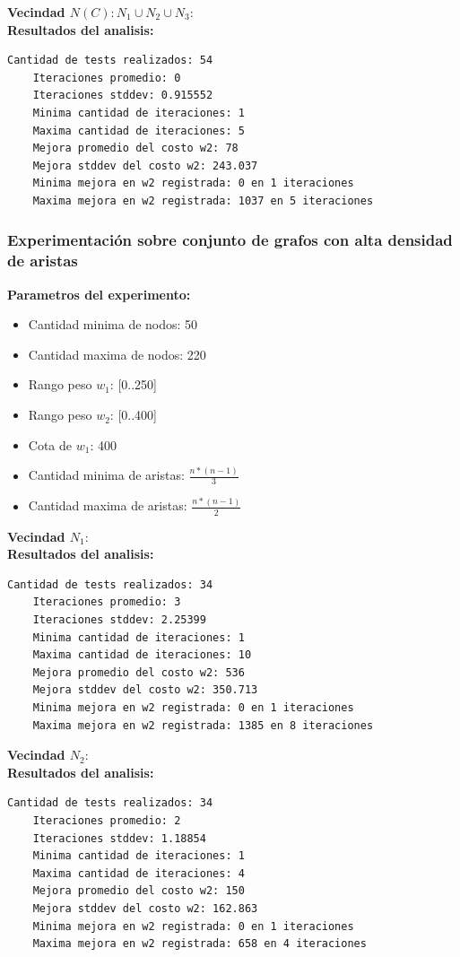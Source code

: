 \textbf{Vecindad $N(C): N_1 \cup N_2 \cup N_3$}:\\
\textbf{Resultados del analisis:}
\begin{lstlisting}[frame=single]
	Cantidad de tests realizados: 54
	Iteraciones promedio: 0
	Iteraciones stddev: 0.915552
	Minima cantidad de iteraciones: 1
	Maxima cantidad de iteraciones: 5
	Mejora promedio del costo w2: 78
	Mejora stddev del costo w2: 243.037
	Minima mejora en w2 registrada: 0 en 1 iteraciones
	Maxima mejora en w2 registrada: 1037 en 5 iteraciones
\end{lstlisting}

\subsubsection{Experimentaci\'on sobre conjunto de grafos con alta densidad de aristas}

\textbf{Parametros del experimento:}
\begin{itemize}
	\item Cantidad minima de nodos: 50
	\item Cantidad maxima de nodos: 220
	\item Rango peso $w_1$: [0..250]
	\item Rango peso $w_2$: [0..400]
	\item Cota de $w_1$: 400
	\item Cantidad minima de aristas: $\frac{n * (n-1)}{3}$
	\item Cantidad maxima de aristas: $\frac{n * (n-1)}{2}$
\end{itemize}  

\textbf{Vecindad $N_1$}:\\%
\textbf{Resultados del analisis:}
\begin{lstlisting}[frame=single]
	Cantidad de tests realizados: 34
	Iteraciones promedio: 3
	Iteraciones stddev: 2.25399
	Minima cantidad de iteraciones: 1
	Maxima cantidad de iteraciones: 10
	Mejora promedio del costo w2: 536
	Mejora stddev del costo w2: 350.713
	Minima mejora en w2 registrada: 0 en 1 iteraciones
	Maxima mejora en w2 registrada: 1385 en 8 iteraciones
\end{lstlisting}

\textbf{Vecindad $N_2$}:\\%
\textbf{Resultados del analisis:}
\begin{lstlisting}[frame=single]
	Cantidad de tests realizados: 34
	Iteraciones promedio: 2
	Iteraciones stddev: 1.18854
	Minima cantidad de iteraciones: 1
	Maxima cantidad de iteraciones: 4
	Mejora promedio del costo w2: 150
	Mejora stddev del costo w2: 162.863
	Minima mejora en w2 registrada: 0 en 1 iteraciones
	Maxima mejora en w2 registrada: 658 en 4 iteraciones
\end{lstlisting}

